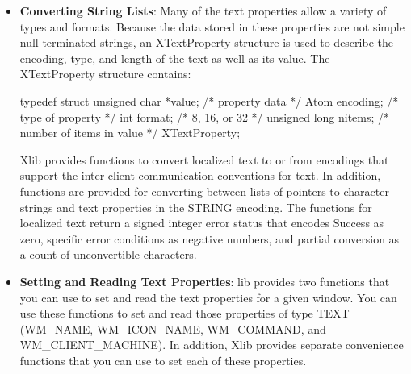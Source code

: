 \documentclass{report}
\begin{document}
\begin{itemize}
\begin{itemize}
\begin{itemize}
                \item values Specifies the XWindowChanges structure.
            \end{itemize}
            The XReconfigureWMWindow function issues a ConfigureWindow request on the specified top-level window. If the stacking mode is changed and the request fails with a BadMatch error, the error is trapped by Xlib and a synthetic ConfigureRequestEvent containing the same configuration parameters is sent to the root of the specified window. Window managers may elect to receive this event and treat it as a request to reconfigure the indicated window. It returns a nonzero status if the request or event is successfully sent; otherwise, it returns a zero status.
            \bigbreak \noindent 
            XReconfigureWMWindow can generate BadValue and BadWindow errors.
        \item \textbf{Converting String Lists}: Many of the text properties allow a variety of types and formats. Because the data stored in these properties are not simple null-terminated strings, an XTextProperty structure is used to describe the encoding, type, and length of the text as well as its value. The XTextProperty structure contains:
            \bigbreak \noindent 
            \begin{cppcode}
                typedef struct {
                    unsigned char *value;       /* property data */
                    Atom encoding;              /* type of property */
                    int format;                 /* 8, 16, or 32 */
                    unsigned long nitems;       /* number of items in value */
                } XTextProperty;
            \end{cppcode}
            \bigbreak \noindent 
            Xlib provides functions to convert localized text to or from encodings that support the inter-client communication conventions for text. In addition, functions are provided for converting between lists of pointers to character strings and text properties in the STRING encoding.
            \bigbreak \noindent 
            The functions for localized text return a signed integer error status that encodes Success as zero, specific error conditions as negative numbers, and partial conversion as a count of unconvertible characters.
        \item \textbf{Setting and Reading Text Properties}: lib provides two functions that you can use to set and read the text properties for a given window. You can use these functions to set and read those properties of type TEXT (WM\_NAME, WM\_ICON\_NAME, WM\_COMMAND, and WM\_CLIENT\_MACHINE). In addition, Xlib provides separate convenience functions that you can use to set each of these properties.

\end{itemize}
\end{itemize}
\end{document}
